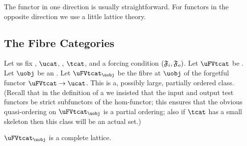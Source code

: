 \documentclass[%
a4paper,%
arxiv,%
defaults
]{myclass}
\begin{document}
The functor in one direction is usually straightforward.
For functors in the opposite direction we use a little lattice theory.

\subsection{The Fibre Categories}

Let us fix \ucat, \(\ucat\), \tcat, \(\tcat\), and a forcing condition \((\iforce, \oforce)\).
Let \(\uFVtcat\) be \uFVtcat.
Let \(\uobj\) be an \uobj.
Let \(\uFVtcat_{\uobj}\) be the fibre at \(\uobj\) of the forgetful functor \(\uFVtcat \to \ucat\).
This is a, possibly large, partially ordered class.
(Recall that in the definition of a \uVtobj we insisted that the input and output test functors be strict subfunctors of the hom\hyp{}functor; this ensures that the obvious quasi\hyp{}ordering on \(\uFVtcat_{\uobj}\) is a partial ordering; also if \(\tcat\) has a small skeleton then this class will be an actual set.)

\begin{proposition}
\label{prop:lattice}
\(\uFVtcat_{\uobj}\) is a complete lattice.
\end{proposition}
\end{document}
